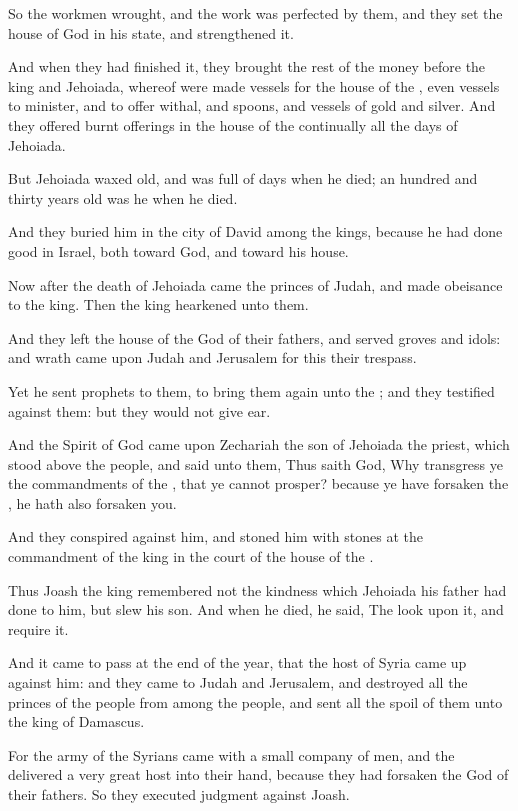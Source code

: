 \Verse So the workmen wrought, and the work was perfected by them, and they set the house of God in his state, and strengthened it.

\Verse And when they had finished it, they brought the rest of the money before the king and Jehoiada, whereof were made vessels for the house of the \LORD, even vessels to minister, and to offer withal, and spoons, and vessels of gold and silver. And they offered burnt offerings in the house of the \LORD continually all the days of Jehoiada.

\Verse But Jehoiada waxed old, and was full of days when he died; an hundred and thirty years old was he when he died.

\Verse And they buried him in the city of David among the kings, because he had done good in Israel, both toward God, and toward his house.

\Verse Now after the death of Jehoiada came the princes of Judah, and made obeisance to the king. Then the king hearkened unto them.

\Verse And they left the house of the \LORD God of their fathers, and served groves and idols: and wrath came upon Judah and Jerusalem for this their trespass.

\Verse Yet he sent prophets to them, to bring them again unto the \LORD; and they testified against them: but they would not give ear.

\Verse And the Spirit of God came upon Zechariah the son of Jehoiada the priest, which stood above the people, and said unto them, Thus saith God, Why transgress ye the commandments of the \LORD, that ye cannot prosper? because ye have forsaken the \LORD, he hath also forsaken you.

\Verse And they conspired against him, and stoned him with stones at the commandment of the king in the court of the house of the \LORD.

\Verse Thus Joash the king remembered not the kindness which Jehoiada his father had done to him, but slew his son. And when he died, he said, The \LORD look upon it, and require it.

\Verse And it came to pass at the end of the year, that the host of Syria came up against him: and they came to Judah and Jerusalem, and destroyed all the princes of the people from among the people, and sent all the spoil of them unto the king of Damascus.

\Verse For the army of the Syrians came with a small company of men, and the \LORD delivered a very great host into their hand, because they had forsaken the \LORD God of their fathers. So they executed judgment against Joash.

